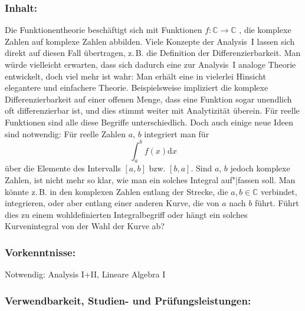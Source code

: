 \documentclass[a4paper,10pt]{article}
\begin{document}
\subsubsection*{\large
    Inhalt:
}
Die Funktionentheorie beschäftigt sich mit Funktionen $f : \mathbb C \to \mathbb C$ , die komplexe Zahlen auf komplexe
Zahlen abbilden. Viele Konzepte der Analysis~I lassen sich direkt auf diesen Fall übertragen, z.\,B. die
Definition der Differenzierbarkeit. Man würde vielleicht erwarten, dass sich dadurch eine zur Analysis~I
analoge Theorie entwickelt, doch viel mehr ist wahr: Man erhält eine in vielerlei Hinsicht elegantere und
einfachere Theorie. Beispielsweise impliziert die komplexe Differenzierbarkeit auf einer offenen Menge, dass
eine Funktion sogar unendlich oft differenzierbar ist, und dies stimmt weiter mit Analytizität überein. Für
reelle Funktionen sind alle diese Begriffe unterschiedlich. Doch auch einige neue Ideen sind notwendig: Für
reelle Zahlen $a$, $b$ integriert man für
$$\int_a^b f(x) \mathrm dx$$
über die Elemente des Intervalls $[a, b]$ bzw. $[b, a]$. Sind $a$, $b$ jedoch komplexe Zahlen, ist nicht mehr so
klar, wie man ein solches Integral auf"|fassen soll. Man könnte z.\,B. in den komplexen Zahlen entlang der
Strecke, die $a, b \in \mathbb C$ verbindet, integrieren, oder aber entlang einer anderen Kurve, die von $a$ nach $b$ führt.
Führt dies zu einem wohldefinierten Integralbegriff oder hängt ein solches Kurvenintegral von der Wahl
der Kurve ab?
\subsubsection*{\large
    Vorkenntnisse:
}
Notwendig: Analysis I+II, Lineare Algebra I
\cleardoublepage
\subsubsection*{\large
    Verwendbarkeit, Studien- und Prüfungsleistungen:
}
\end{document}
